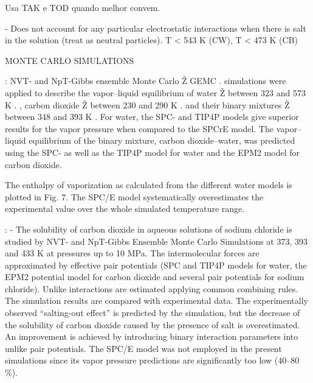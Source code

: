 Usa TAK e TOD quando melhor convem.

- Does not account for any particular electrostatic interactions when there is salt in the solution (treat as neutral particles). T < 543 K (CW), T < 473 K (CB)






















MONTE CARLO SIMULATIONS

\cite{Vorholz2000}: NVT- and NpT-Gibbs ensemble Monte Carlo Ž GEMC . simulations were applied to describe the vapor–liquid equilibrium of water Ž between 323 and 573 K . , carbon dioxide Ž between 230 and 290 K . and their binary mixtures Ž between 348 and 393 K . For water, the
SPC- and TIP4P models give superior results for the vapor pressure when compared to the SPCrE model. The
vapor–liquid equilibrium of the binary mixture, carbon dioxide–water, was predicted using the SPC- as well as
the TIP4P model for water and the EPM2 model for carbon dioxide.

The enthalpy of vaporization as calculated from the different water models is plotted in Fig. 7. The SPC/E model systematically overestimates the experimental value over the whole simulated temperature range.


\cite{Vorholz2004}: - The solubility of carbon dioxide in aqueous solutions of sodium chloride is studied by NVT- and NpT-Gibbs Ensemble Monte Carlo Simulations at 373, 393 and 433 K at pressures up to 10 MPa. The intermolecular forces are approximated by effective pair potentials (SPC and TIP4P models for water, the EPM2 potential model for carbon dioxide and several pair potentials for sodium chloride). Unlike interactions are estimated applying common combining rules. The simulation results are compared with experimental data. The experimentally observed “salting-out effect” is predicted by the simulation, but the decrease of the solubility of carbon dioxide caused by the presence of salt is overestimated. An improvement is achieved by introducing binary interaction parameters into unlike pair potentials. The SPC/E model was not employed in the present simulations since its vapor pressure predictions are significantly too low (40–80 \%).


